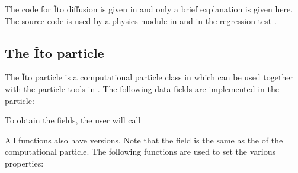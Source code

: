 \documentclass[letterpaper,10pt,english]{sphinxmanual}
\begin{document}
The code for Îto diffusion is given in  and only a brief explanation is given here.
The source code is used by a physics module in  and in the regression test .


\subsection{The Îto particle}
\label{\detokenize{Solvers/Ito:the-ito-particle}}\label{\detokenize{Solvers/Ito:chap-ito-particle}}
The Îto particle is a computational particle class in  which can be used together with the particle tools in .
The following data fields are implemented in the particle:

\begin{sphinxVerbatim}[commandchars=\\\{\},formatcom=\scriptsize]
 
 
 
 
\end{sphinxVerbatim}

To obtain the fields, the user will call

\begin{sphinxVerbatim}[commandchars=\\\{\},formatcom=\scriptsize]
 
 
 
 
\end{sphinxVerbatim}

All functions also have  versions.
Note that the field  is the same as the  of the computational particle.
The following functions are used to set the various properties:

\begin{sphinxVerbatim}[commandchars=\\\{\},formatcom=\scriptsize]
  
  
  
  
\end{sphinxVerbatim}
\end{document}
